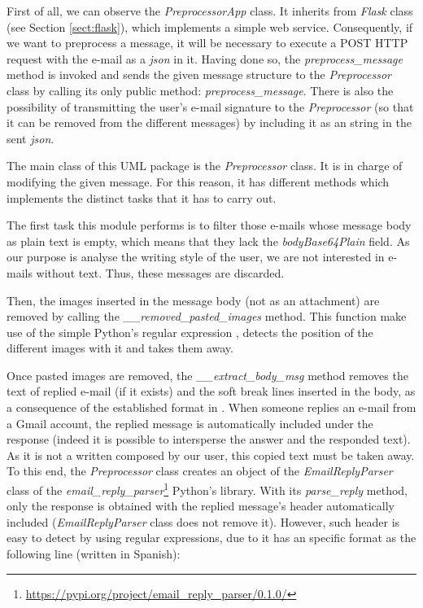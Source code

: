 First of all, we can observe the \textit{PreprocessorApp} class. It inherits from \textit{Flask} class (see Section \ref{sect:flask}), which implements a simple web service. Consequently, if we want to preprocess a message, it will be necessary to execute a POST HTTP request with the e-mail as a \textit{json} in it. Having done so, the \textit{preprocess\_message} method is invoked and sends the given message structure to the \textit{Preprocessor} class by calling its only public method: \textit{preprocess\_message}. There is also the possibility of transmitting the user's e-mail signature to the \textit{Preprocessor} (so that it can be removed from the different messages) by including it as an string in the sent \textit{json}.

The main class of this UML package is the \textit{Preprocessor} class. It is in charge of modifying the given message. For this reason, it has different methods which implements the distinct tasks that it has to carry out.

The first task this module performs is to filter those e-mails whose message body as plain text is empty, which means that they lack the \textit{bodyBase64Plain} field. As our purpose is analyse the writing style of the user, we are not interested in e-mails without text. Thus, these messages are discarded.

Then, the images inserted in the message body (not as an attachment) are removed by calling the \textit{\_\_removed\_pasted\_images} method. This function make use of the simple Python's regular expression \pythoninline{r'\\[image:[\^\\]]+\\]'}, detects the position of the different images with it and takes them away.

Once pasted images are removed, the \textit{\_\_extract\_body\_msg} method removes the text of replied e-mail (if it exists) and the soft break lines inserted in the body, as a consequence of the established format in \cite{rfc2646}. When someone replies an e-mail from a Gmail account, the replied message is automatically included under the response (indeed it is possible to intersperse the answer and the responded text). As it is not a written composed by our user, this copied text must be taken away. To this end, the \textit{Preprocessor} class creates an object of the \textit{EmailReplyParser} class of the \textit{email\_reply\_parser}\footnote{\url{https://pypi.org/project/email_reply_parser/0.1.0/}} Python's library. With its \textit{parse\_reply} method, only the response is obtained with the replied message's header automatically included (\textit{EmailReplyParser} class does not remove it). However, such header is easy to detect by using regular expressions, due to it has an specific format as the following line (written in Spanish):

